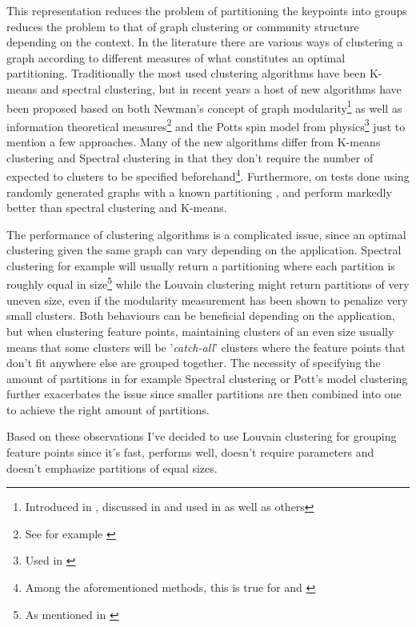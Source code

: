 \documentclass{article}
\begin{document}
This representation reduces the problem of partitioning the keypoints 
into groups reduces the problem to that of graph clustering or community 
structure depending on the context. In the literature there are various 
ways of clustering a graph according to different measures of what 
constitutes an optimal partitioning. Traditionally the most used 
clustering algorithms have been K-means and spectral clustering, but in 
recent years a host of new algorithms have been proposed based on both 
Newman's concept of graph modularity\footnote{Introduced in 
\cite{girvan2002}, discussed in \cite{brandes2007} and used in 
\cite{blondel2008} as well as others} as well as information theoretical 
measures\footnote{See for example \cite{rosvall2008}} and the Potts spin 
model from physics\footnote{Used in \cite{ronhovde2009}} just to mention 
a few approaches. Many of the new algorithms differ from K-means 
clustering and Spectral clustering in that they don't require the number 
of expected to clusters to be specified beforehand\footnote{Among the 
aforementioned methods, this is true for \cite{blondel2008} and 
\cite{rosvall2008}}.  Furthermore, on tests done using randomly 
generated graphs with a known partitioning \cite{blondel2008}, 
\cite{rosvall2008} and \cite{ronhovde2009} perform markedly better than 
spectral clustering and K-means\cite{lancichinetti2009}.

The performance of clustering algorithms is a complicated issue, since 
an optimal clustering given the same graph can vary depending on the 
application. Spectral clustering for example will usually return a 
partitioning where each partition is roughly equal in size\footnote{As 
mentioned in \cite{von2007}} while the Louvain 
clustering\cite{blondel2008} might return partitions of very uneven 
size, even if the modularity measurement has been shown to penalize very 
small clusters\cite{brandes2007}. Both behaviours can be beneficial 
depending on the application, but when clustering feature points, 
maintaining clusters of an even size usually means that some clusters 
will be '\emph{catch-all}' clusters where the feature points that don't 
fit anywhere else are grouped together. The necessity of specifying the 
amount of partitions in for example Spectral clustering or Pott's model 
clustering further exacerbates the issue since smaller partitions are 
then combined into one to achieve the right amount of partitions.

Based on these observations I've decided to use Louvain clustering for 
grouping feature points since it's fast, performs well, doesn't require 
parameters and doesn't emphasize partitions of equal sizes.
\end{document}

